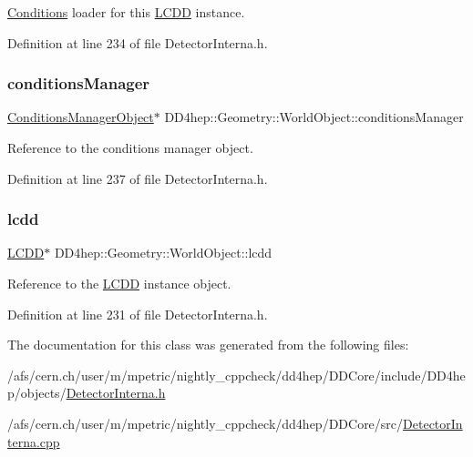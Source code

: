 \hyperlink{namespace_d_d4hep_1_1_conditions}{Conditions} loader for this \hyperlink{class_d_d4hep_1_1_geometry_1_1_l_c_d_d}{L\+C\+DD} instance. 



Definition at line 234 of file Detector\+Interna.\+h.

\hypertarget{class_d_d4hep_1_1_geometry_1_1_world_object_a325a757896034d63270e1decfc883b8b}{}\label{class_d_d4hep_1_1_geometry_1_1_world_object_a325a757896034d63270e1decfc883b8b} 
\subsubsection{\texorpdfstring{conditions\+Manager}{conditionsManager}}
{\footnotesize\ttfamily \hyperlink{class_d_d4hep_1_1_geometry_1_1_world_object_a96576e6e392fe72924c1135cc8907aec}{Conditions\+Manager\+Object}$\ast$ D\+D4hep\+::\+Geometry\+::\+World\+Object\+::conditions\+Manager}



Reference to the conditions manager object. 



Definition at line 237 of file Detector\+Interna.\+h.

\hypertarget{class_d_d4hep_1_1_geometry_1_1_world_object_a72d88491949f298897e034e2e5bc74df}{}\label{class_d_d4hep_1_1_geometry_1_1_world_object_a72d88491949f298897e034e2e5bc74df} 
\subsubsection{\texorpdfstring{lcdd}{lcdd}}
{\footnotesize\ttfamily \hyperlink{class_d_d4hep_1_1_geometry_1_1_l_c_d_d}{L\+C\+DD}$\ast$ D\+D4hep\+::\+Geometry\+::\+World\+Object\+::lcdd}



Reference to the \hyperlink{class_d_d4hep_1_1_geometry_1_1_l_c_d_d}{L\+C\+DD} instance object. 



Definition at line 231 of file Detector\+Interna.\+h.



The documentation for this class was generated from the following files\+:\begin{DoxyCompactItemize}
\item 
/afs/cern.\+ch/user/m/mpetric/nightly\+\_\+cppcheck/dd4hep/\+D\+D\+Core/include/\+D\+D4hep/objects/\hyperlink{_detector_interna_8h}{Detector\+Interna.\+h}\item 
/afs/cern.\+ch/user/m/mpetric/nightly\+\_\+cppcheck/dd4hep/\+D\+D\+Core/src/\hyperlink{_detector_interna_8cpp}{Detector\+Interna.\+cpp}\end{DoxyCompactItemize}
